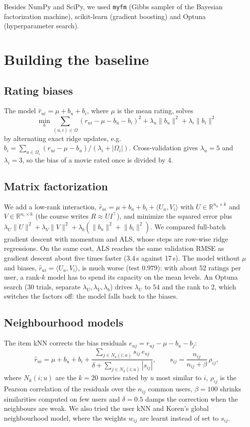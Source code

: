 \documentclass[11pt,a4paper]{article}
\newcommand{\R}{\mathbb{R}}
\newcommand{\rhat}{\hat r}
\begin{document}
Besides NumPy and SciPy, we used \texttt{myfm} (Gibbs sampler of the Bayesian factorization machine),
scikit-learn (gradient boosting) and Optuna (hyperparameter search).

\section{Building the baseline}

\subsection{Rating biases}
The model $\rhat_{ui} = \mu + b_u + b_i$, where $\mu$ is the mean rating, solves
\[
\min_{b} \sum_{(u,i)\in\Omega} (r_{ui} - \mu - b_u - b_i)^2 + \lambda_u \lVert b_u\rVert^2 + \lambda_i \lVert b_i\rVert^2
\]
by alternating exact ridge updates, e.g.\ $b_i = \sum_{u\in\Omega_i}(r_{ui}-\mu-b_u)/(\lambda_i+|\Omega_i|)$.
Cross-validation gives $\lambda_u = 5$ and $\lambda_i = 3$, so the bias of a movie rated once is divided by 4.

\subsection{Matrix factorization}
We add a low-rank interaction, $\rhat_{ui} = \mu + b_u + b_i + \langle U_u, V_i\rangle$ with
$U \in \R^{n_u\times k}$ and $V \in \R^{n_i\times k}$ (the course writes $R \approx U I^\top$), and minimize the
squared error plus $\lambda_U\lVert U\rVert^2 + \lambda_V\lVert V\rVert^2 + \lambda_b(\lVert b_u\rVert^2+\lVert b_i\rVert^2)$.
We compared full-batch gradient descent with momentum and ALS, whose steps are row-wise ridge regressions.
On the same cost, ALS reaches the same validation RMSE as gradient descent about five times faster (3.4\,s
against 17\,s). The model without $\mu$ and biases, $\rhat_{ui} = \langle U_u, V_i\rangle$, is much worse
(test $0.979$): with about 52 ratings per user, a rank-$k$ model has to spend its capacity on the mean levels.
An Optuna search (30 trials, separate $\lambda_U, \lambda_V, \lambda_b$) drives $\lambda_U$ to $54$ and the rank
to 2, which switches the factors off: the model falls back to the biases.

\subsection{Neighbourhood models}
The item kNN corrects the bias residuals $e_{uj} = r_{uj} - \mu - b_u - b_j$:
\[
\rhat_{ui} = \mu + b_u + b_i + \frac{\sum_{j \in N_k(i;u)} s_{ij}\, e_{uj}}{\delta + \sum_{j\in N_k(i;u)} |s_{ij}|},
\qquad s_{ij} = \frac{n_{ij}}{n_{ij}+\beta}\,\rho_{ij},
\]
where $N_k(i;u)$ are the $k = 20$ movies rated by $u$ most similar to $i$, $\rho_{ij}$ is the Pearson correlation
of the residuals over the $n_{ij}$ common users, $\beta = 100$ shrinks similarities computed on few users and
$\delta = 0.5$ damps the correction when the neighbours are weak. We also tried the user kNN and Koren's
global neighbourhood model, where the weights $w_{ij}$ are learnt instead of set to $s_{ij}$.
\end{document}

